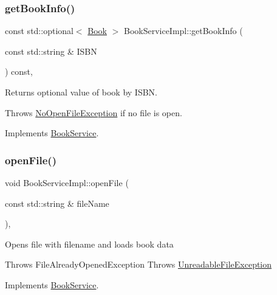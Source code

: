 \subsubsection{\texorpdfstring{get\+Book\+Info()}{getBookInfo()}}
{\footnotesize\ttfamily const std\+::optional$<$ \hyperlink{classBook}{Book} $>$ Book\+Service\+Impl\+::get\+Book\+Info (\begin{DoxyParamCaption}\item[{const std\+::string \&}]{I\+S\+BN }\end{DoxyParamCaption}) const\hspace{0.3cm}{\ttfamily [override]}, {\ttfamily [virtual]}}

Returns optional value of book by I\+S\+BN.

Throws \hyperlink{structNoOpenFileException}{No\+Open\+File\+Exception} if no file is open. 

Implements \hyperlink{classBookService_ad9da09e509b68ab1f7d93792206ce13c}{Book\+Service}.

\mbox{\label{classBookServiceImpl_ab95aca2128c3abe9826a54ba4efff14b}} 
\subsubsection{\texorpdfstring{open\+File()}{openFile()}}
{\footnotesize\ttfamily void Book\+Service\+Impl\+::open\+File (\begin{DoxyParamCaption}\item[{const std\+::string \&}]{file\+Name }\end{DoxyParamCaption})\hspace{0.3cm}{\ttfamily [override]}, {\ttfamily [virtual]}}

Opens file with filename and loads book data

Throws File\+Already\+Opened\+Exception Throws \hyperlink{structUnreadableFileException}{Unreadable\+File\+Exception} 

Implements \hyperlink{classBookService_ad74916338cb66cfa8ae7dc24f60dec0e}{Book\+Service}.

\mbox{\label{classBookServiceImpl_ad0673fa9012b0454b0cbed190bcdc6e4}} 
